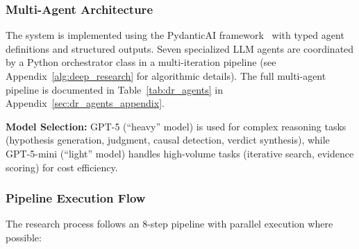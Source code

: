 \subsubsection{Multi-Agent Architecture}

The system is implemented using the PydanticAI framework~\cite{pydanticai2024} with typed agent definitions and structured outputs. Seven specialized LLM agents are coordinated by a Python orchestrator class in a multi-iteration pipeline (see Appendix~\ref{alg:deep_research} for algorithmic details). The full multi-agent pipeline is documented in Table~\ref{tab:dr_agents} in Appendix~\ref{sec:dr_agents_appendix}.

\textbf{Model Selection:} GPT-5 (``heavy'' model) is used for complex reasoning tasks (hypothesis generation, judgment, causal detection, verdict synthesis), while GPT-5-mini (``light'' model) handles high-volume tasks (iterative search, evidence scoring) for cost efficiency.



\subsubsection{Pipeline Execution Flow}

The research process follows an 8-step pipeline with parallel execution where possible:

